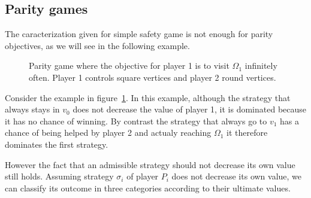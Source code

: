 \subsection{Parity games}\label{parity-games}

The caracterization given for simple safety game is not enough for
parity objectives, as we will see in the following example.

\begin{figure}
  \begin{center}
    \caption{Parity game where the objective for player 1 is to visit
      $\Omega_1$ infinitely often. Player 1 controls square vertices and player 2
      round vertices.}
    \label{fig:adm-parity}
  \end{center}
\end{figure}

\begin{example}
  Consider the example in figure~\cref{fig:adm-parity}.
  In this example, although the strategy that always stays in $v_0$
  does not decrease the value of player 1, it is dominated because
  it has no chance of winning.
  By contrast the strategy that always go to $v_1$ has a chance of
  being helped by player 2 and actualy reaching $\Omega_1$ it therefore
  dominates the first strategy.
\end{example}

However the fact that an admissible strategy should not decrease its own
value still holds. Assuming strategy \(\sigma_i\) of player \(P_i\) does
not decrease its own value, we can classify its outcome in three
categories according to their ultimate values.

